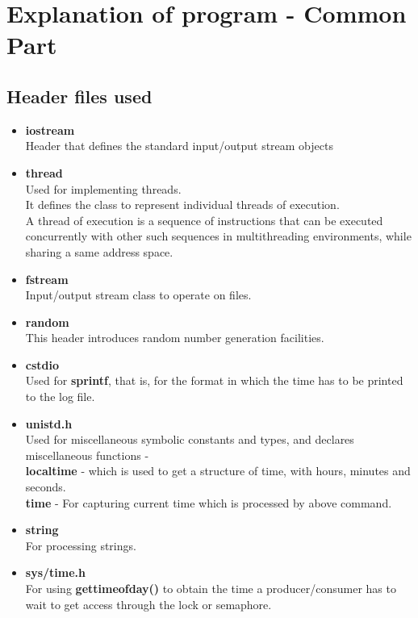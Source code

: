 \documentclass[12pt]{article}
\begin{document}
\section{Explanation of program - Common Part}

\subsection{Header files used}
\begin{itemize}
\item \textbf{iostream}\\
Header that defines the standard input/output stream objects
\item \textbf{thread}\\
Used for implementing threads.\\
It defines the class to represent individual threads of execution.\\
A thread of execution is a sequence of instructions that can be executed concurrently with other such sequences in multithreading environments, while sharing a same address space.\\
\item \textbf{fstream}\\
Input/output stream class to operate on files.
\item \textbf{random}\\
This header introduces random number generation facilities.\\
\item \textbf{cstdio}\\
Used for \textbf{sprintf}, that is, for the format in which the time has to be printed to the log file.
\item \textbf{unistd.h}\\
Used for miscellaneous symbolic constants and types, and declares miscellaneous functions - \\
\textbf{localtime} - which is used to get a structure of time, with hours, minutes and seconds.\\
\textbf{time} - For capturing current time which is processed by above command.
\item \textbf{string}\\
For processing strings.
\item \textbf{sys/time.h}\\
For using \textbf{gettimeofday()} to obtain the time a producer/consumer has to wait to get access through the lock or semaphore.
\end{itemize}
\end{document}
